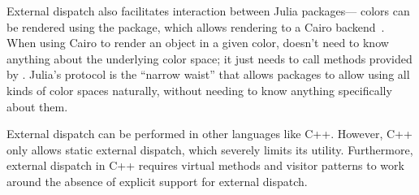 
External dispatch also facilitates interaction between Julia packages--- 
colors can be rendered using the  package,
which allows rendering to a Cairo backend~\cite{cairographics}.
When using Cairo to render an object in a given color, 
doesn't need to know anything about the underlying color space; it just
needs to call  methods provided by .
Julia's  protocol is the ``narrow waist'' that allows
packages to allow using all kinds of color spaces naturally, without
needing to know anything specifically about them.

External dispatch can be performed in other languages like C++. However,
C++ only allows static external dispatch, which severely limits its utility.
Furthermore, external dispatch in C++ requires virtual methods and visitor
patterns\cite{designpatterns} to work around the absence of explicit support
for external dispatch.

